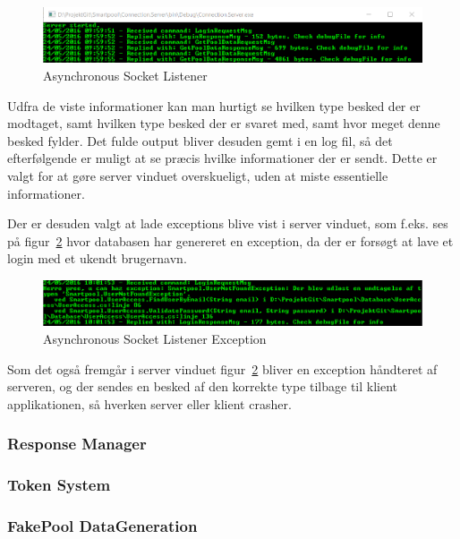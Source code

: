 \begin{figure}
	\centering
	\includegraphics[width=0.7\linewidth]{figs/connection/asynchronousSocketListener.png}
	\caption{Asynchronous Socket Listener}
	\label{fig:asynchronousSocketListener}
\end{figure}

Udfra de viste informationer kan man hurtigt se hvilken type besked der er modtaget, samt hvilken type besked der er svaret med, samt hvor meget denne besked fylder. Det fulde output bliver desuden gemt i en log fil, så det efterfølgende er muligt at se præcis hvilke informationer der er sendt. Dette er valgt for at gøre server vinduet overskueligt, uden at miste essentielle informationer.

Der er desuden valgt at lade exceptions blive vist i server vinduet, som f.eks. ses på figur~\ref{fig:asynchronousSocketListenerException} hvor databasen har genereret en exception, da der er forsøgt at lave et login med et ukendt brugernavn.

\begin{figure}
	\centering
	\includegraphics[width=0.7\linewidth]{figs/connection/asynchronousSocketListenerException.png}
	\caption{Asynchronous Socket Listener Exception}
	\label{fig:asynchronousSocketListenerException}
\end{figure}

Som det også fremgår i server vinduet figur~\ref{fig:asynchronousSocketListenerException} bliver en exception håndteret af serveren, og der sendes en besked af den korrekte type tilbage til klient applikationen, så hverken server eller klient crasher.

\subsubsection{Response Manager}

\subsubsection{Token System}

\subsubsection{FakePool DataGeneration}

